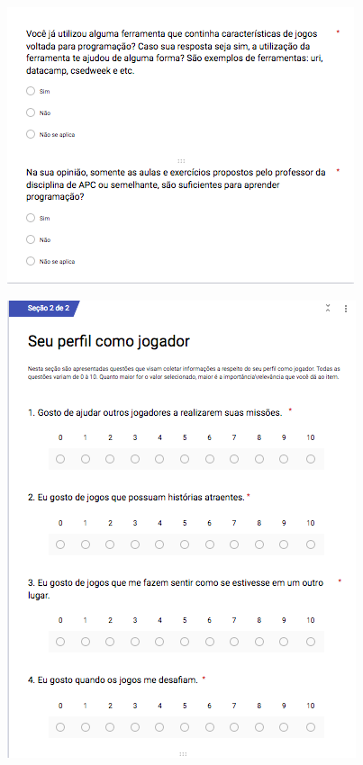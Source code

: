 \begin{apendicesenv}
\begin{figure}[h]
	\centering
	\includegraphics[keepaspectratio=true,scale=0.9]{figuras/q5.png}
\end{figure}

\begin{figure}[h]
	\centering
	\includegraphics[keepaspectratio=true,scale=0.9]{figuras/q6.png}
\end{figure}


\end{apendicesenv}
